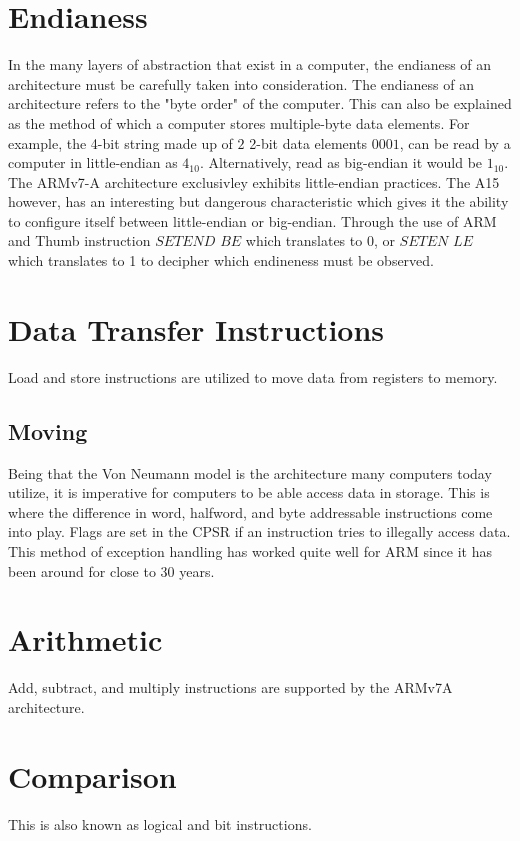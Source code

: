 \documentclass[12pt]{scrreprt}
\begin{document}
	\section{Endianess}
	In the many layers of abstraction that exist in a computer, the endianess of an architecture must be carefully taken into consideration.
	The endianess of an architecture refers to the "byte order" of the computer.
	This can also be explained as the method of which a computer stores multiple-byte data elements.
	For example, the 4-bit string made up of $2$ 2-bit data elements $0001$, can be read by a computer in little-endian as $4_{10}$. 
	Alternatively, read as big-endian it would be $1_{10}$.
	The ARMv7-A architecture exclusivley exhibits little-endian practices.
	The A15 however, has an interesting but dangerous characteristic which gives it the ability to configure itself between little-endian or big-endian.
	Through the use of ARM and Thumb instruction $SETEND$ $BE$ which translates to 0, or $SETEN$ $LE$ which translates to 1 to decipher which endineness must be observed.

	\section{Data Transfer Instructions}
	Load and store instructions are utilized to move data from registers to memory.

	\subsection{Moving}
	Being that the Von Neumann model is the architecture many computers today utilize, it is imperative for computers to be able access data in storage.
	This is where the difference in word, halfword, and byte addressable instructions come into play.
	Flags are set in the CPSR if an instruction tries to illegally access data.
	This method of exception handling has worked quite well for ARM since it has been around for close to 30 years.

	\section{Arithmetic}
		Add, subtract, and multiply instructions are supported by the ARMv7A architecture.
	\section{Comparison}
		This is also known as logical and bit instructions.
\end{document}
